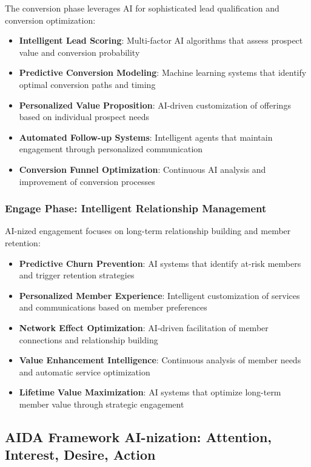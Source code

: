 The conversion phase leverages AI for sophisticated lead qualification and conversion optimization:

\begin{itemize}
    \item \textbf{Intelligent Lead Scoring}: Multi-factor AI algorithms that assess prospect value and conversion probability
    \item \textbf{Predictive Conversion Modeling}: Machine learning systems that identify optimal conversion paths and timing
    \item \textbf{Personalized Value Proposition}: AI-driven customization of offerings based on individual prospect needs
    \item \textbf{Automated Follow-up Systems}: Intelligent agents that maintain engagement through personalized communication
    \item \textbf{Conversion Funnel Optimization}: Continuous AI analysis and improvement of conversion processes
\end{itemize}

\subsubsection{Engage Phase: Intelligent Relationship Management}

AI-nized engagement focuses on long-term relationship building and member retention:

\begin{itemize}
    \item \textbf{Predictive Churn Prevention}: AI systems that identify at-risk members and trigger retention strategies
    \item \textbf{Personalized Member Experience}: Intelligent customization of services and communications based on member preferences
    \item \textbf{Network Effect Optimization}: AI-driven facilitation of member connections and relationship building
    \item \textbf{Value Enhancement Intelligence}: Continuous analysis of member needs and automatic service optimization
    \item \textbf{Lifetime Value Maximization}: AI systems that optimize long-term member value through strategic engagement
\end{itemize}

\subsection{AIDA Framework AI-nization: Attention, Interest, Desire, Action}

